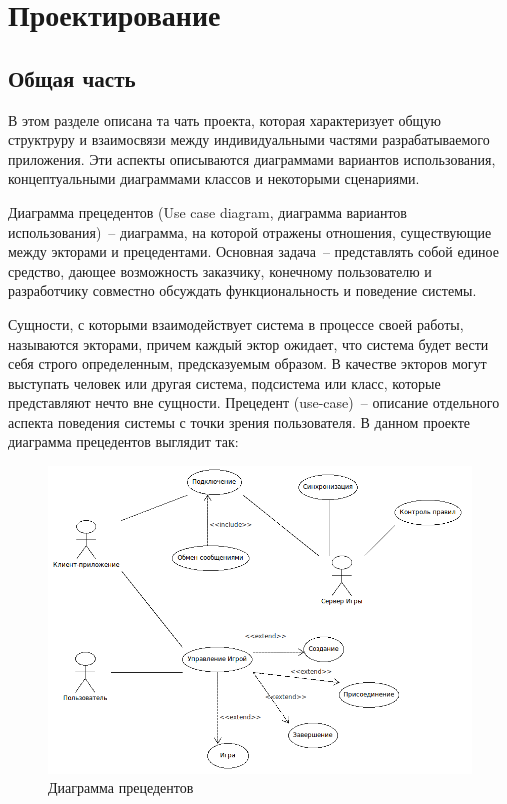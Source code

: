 ﻿\section{Проектирование}
\subsection{Общая часть}
В этом разделе описана та чать проекта, которая характеризует общую структруру и взаимосвязи между индивидуальными частями разрабатываемого приложения.
Эти аспекты описываются диаграммами вариантов использования, концептуальными диаграммами классов и некоторыми сценариями.

Диаграмма прецедентов (Use case diagram, диаграмма вариантов использования)~-- диаграмма, на которой отражены отношения, 
существующие между экторами и прецедентами.
Основная задача~-- представлять собой единое средство, дающее возможность заказчику, конечному пользователю и разработчику совместно
обсуждать функциональность и поведение системы.

Сущности, с которыми взаимодействует система в процессе своей работы, называются экторами, причем каждый эктор ожидает, 
что система будет вести себя строго определенным, предсказуемым образом. В качестве экторов могут выступать человек или 
другая система, подсистема или класс, которые представляют нечто вне сущности.
Прецедент (use-case)~-- описание отдельного аспекта поведения системы с точки зрения пользователя.
В данном проекте диаграмма прецедентов выглядит так:

\begin{figure}[ht]
\centering
\includegraphics[width=18cm]{images/use.png}
\caption{Диаграмма прецедентов}
\label{fig0}
\end{figure}

